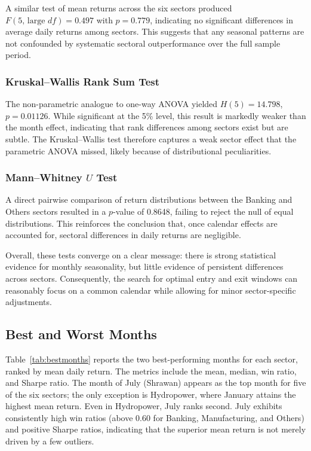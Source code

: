 \documentclass[12pt,a4paper,fleqn]{article}
\begin{document}
A similar test of mean returns across the six sectors produced \(F(5,\, \text{large }df) = 0.497\) with \(p = 0.779\), indicating no significant differences in average daily returns among sectors. This suggests that any seasonal patterns are not confounded by systematic sectoral outperformance over the full sample period.

\subsubsection{Kruskal–Wallis Rank Sum Test}

The non-parametric analogue to one-way ANOVA yielded \(H(5) = 14.798\), \(p = 0.01126\). While significant at the 5\% level, this result is markedly weaker than the month effect, indicating that rank differences among sectors exist but are subtle. The Kruskal–Wallis test therefore captures a weak sector effect that the parametric ANOVA missed, likely because of distributional peculiarities.

\subsubsection{Mann–Whitney \(U\) Test}

A direct pairwise comparison of return distributions between the Banking and Others sectors resulted in a \(p\)-value of 0.8648, failing to reject the null of equal distributions. This reinforces the conclusion that, once calendar effects are accounted for, sectoral differences in daily returns are negligible.

Overall, these tests converge on a clear message: there is strong statistical evidence for monthly seasonality, but little evidence of persistent differences across sectors. Consequently, the search for optimal entry and exit windows can reasonably focus on a common calendar while allowing for minor sector-specific adjustments.

\subsection{Best and Worst Months}

Table~\ref{tab:bestmonths} reports the two best-performing months for each sector, ranked by mean daily return. The metrics include the mean, median, win ratio, and Sharpe ratio. The month of July (Shrawan) appears as the top month for five of the six sectors; the only exception is Hydropower, where January attains the highest mean return. Even in Hydropower, July ranks second. July exhibits consistently high win ratios (above 0.60 for Banking, Manufacturing, and Others) and positive Sharpe ratios, indicating that the superior mean return is not merely driven by a few outliers.
\end{document}
